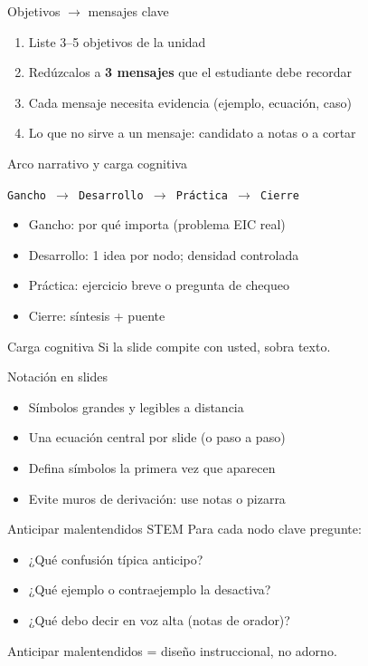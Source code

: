 \documentclass[aspectratio=169,11pt]{beamer}
\begin{document}
\begin{frame}{Objetivos $\rightarrow$ mensajes clave}
\begin{enumerate}
\item Liste 3--5 objetivos de la unidad
\item Redúzcalos a \textbf{3 mensajes} que el estudiante debe recordar
\item Cada mensaje necesita evidencia (ejemplo, ecuación, caso)
\item Lo que no sirve a un mensaje: candidato a notas o a cortar
\end{enumerate}
\end{frame}

\begin{frame}{Arco narrativo y carga cognitiva}
\begin{center}
\texttt{Gancho $\rightarrow$ Desarrollo $\rightarrow$ Práctica $\rightarrow$ Cierre}
\end{center}
\begin{itemize}
\item Gancho: por qué importa (problema EIC real)
\item Desarrollo: 1 idea por nodo; densidad controlada
\item Práctica: ejercicio breve o pregunta de chequeo
\item Cierre: síntesis + puente
\end{itemize}
\begin{alertblock}{Carga cognitiva}
Si la slide compite con usted, sobra texto.
\end{alertblock}
\end{frame}

\begin{frame}{Notación en slides}
\begin{itemize}
\item Símbolos grandes y legibles a distancia
\item Una ecuación central por slide (o paso a paso)
\item Defina símbolos la primera vez que aparecen
\item Evite muros de derivación: use notas o pizarra
\end{itemize}
\end{frame}

\begin{frame}{Anticipar malentendidos STEM}
Para cada nodo clave pregunte:
\begin{itemize}
\item ¿Qué confusión típica anticipo?
\item ¿Qué ejemplo o contraejemplo la desactiva?
\item ¿Qué debo decir en voz alta (notas de orador)?
\end{itemize}
Anticipar malentendidos = diseño instruccional, no adorno.
\end{frame}
\end{document}
